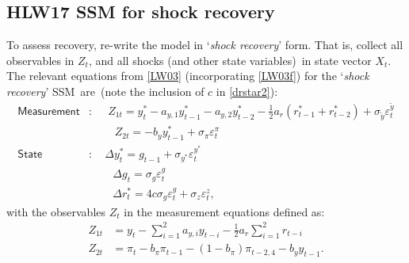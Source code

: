 \documentclass[a4paper,12pt]{article}
\newcommand{\bsq}{\begin{subequations}}\newcommand{\esq}{\end{subequations}}
\newcommand{\vsp}[1]{\vspace*{#1mm}}\newcommand{\hsp}[1]{\hspace*{#1mm}}  }
\begin{document}
\subsection{HLW17 SSM for shock recovery}

To assess recovery, re-write the model in `\emph{shock recovery}' form. That
is, collect all observables in $Z_{t}$, and all shocks (and other state
variables)\ in state vector $X_{t}$. The relevant equations from \ref{LW03}
(incorporating \ref{LW03f}) for the `\emph{shock recovery}' SSM\ are\ (note
the inclusion of $c$ in \ref{drstar2}):\bsq\label{ssm0}%
\begin{align}
\mathsf{Measurement}& :\;\quad Z_{1t}=y_{t}^{\ast }-a_{y,1}y_{t-1}^{\ast
}-a_{y,2}y_{t-2}^{\ast }-\tfrac{1}{2}a_{r}\left( r_{t-1}^{\ast
}+r_{t-2}^{\ast }\right) +\sigma _{\tilde{y}}\varepsilon _{t}^{\tilde{y}} \\
\phantom{\mathsf{Measurement}}& \,\,\;\;\phantom{:\quad}%
Z_{2t}=-b_{y}y_{t-1}^{\ast }+\sigma _{\pi }\varepsilon _{t}^{\pi } \\
\mathsf{State}& :\quad \Delta y_{t}^{\ast }=g_{t-1}+\sigma _{y^{\ast
}}\varepsilon _{t}^{y^{\ast }} \\
\phantom{\mathsf{State}}& \;\,\;\phantom{:\quad}\Delta g_{t}=\sigma
_{g}\varepsilon _{t}^{g} \\
\phantom{\mathsf{State}}& \;\,\;\phantom{:\quad}\Delta r_{t}^{\ast
}=4c\sigma _{g}\varepsilon _{t}^{g}+\sigma _{z}\varepsilon _{t}^{z},
\label{drstar2}
\end{align}%
\esq with the observables $Z_{t}$ in the measurement equations defined as:%
\vsp{-3} 
\begin{align*}
Z_{1t}& =y_{t}-\sum_{i=1}^{2}a_{y,i}y_{t-i}-\tfrac{1}{2}a_{r}%
\sum_{i=1}^{2}r_{t-i} \\
Z_{2t}& =\pi _{t}-b_{\pi }\pi _{t-1}-(1-b_{\pi })\pi _{t-2,4}-b_{y}y_{t-1}.
\end{align*}
\end{document}

